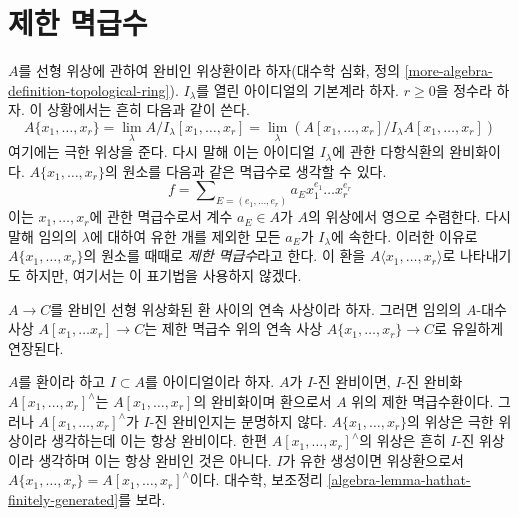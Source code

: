 \section{제한 멱급수}
\label{section-restricted-power-series}

\noindent
$A$를 선형 위상에 관하여 완비인 위상환이라 하자(대수학 심화, 정의
\ref{more-algebra-definition-topological-ring}).
$I_\lambda$를 열린 아이디얼의 기본계라 하자. $r \geq 0$을 정수라 하자.
이 상황에서는 흔히 다음과 같이 쓴다.
$$
A\{x_1, \ldots, x_r\} =
\lim_\lambda A/I_\lambda[x_1, \ldots, x_r] =
\lim_\lambda (A[x_1, \ldots, x_r]/I_\lambda A[x_1, \ldots, x_r])
$$
여기에는 극한 위상을 준다. 다시 말해 이는 아이디얼 $I_\lambda$에
관한 다항식환의 완비화이다. $A\{x_1, \ldots, x_r\}$의 원소를
다음과 같은 멱급수로 생각할 수 있다.
$$
f = \sum\nolimits_{E = (e_1, \ldots, e_r)} a_E x_1^{e_1} \ldots x_r^{e_r}
$$
이는 $x_1, \ldots, x_r$에 관한 멱급수로서 계수 $a_E \in A$가
$A$의 위상에서 영으로 수렴한다. 다시 말해 임의의 $\lambda$에 대하여
유한 개를 제외한 모든 $a_E$가 $I_\lambda$에 속한다. 이러한 이유로
$A\{x_1, \ldots, x_r\}$의 원소를 때때로 {\it 제한 멱급수}라고 한다.
이 환을 $A\langle x_1, \ldots, x_r\rangle$로 나타내기도 하지만,
여기서는 이 표기법을 사용하지 않겠다.

\begin{remark}[제한 멱급수의 보편 성질]
\label{remark-universal-property}
\begin{reference}
\cite[Chapter 0, 7.5.3]{EGA}
\end{reference}
$A \to C$를 완비인 선형 위상화된 환 사이의 연속 사상이라 하자.
그러면 임의의 $A$-대수 사상 $A[x_1, \ldots x_r] \to C$는 제한
멱급수 위의 연속 사상 $A\{x_1, \ldots, x_r\} \to C$로 유일하게 연장된다.
\end{remark}

\begin{remark}
\label{remark-I-adic-completion-and-restricted-power-series}
$A$를 환이라 하고 $I \subset A$를 아이디얼이라 하자. $A$가
$I$-진 완비이면, $I$-진 완비화 $A[x_1, \ldots, x_r]^\wedge$는
$A[x_1, \ldots, x_r]$의 완비화이며 환으로서 $A$ 위의 제한 멱급수환이다.
그러나 $A[x_1, \ldots, x_r]^\wedge$가 $I$-진 완비인지는 분명하지 않다.
$A\{x_1, \ldots, x_r\}$의 위상은 극한 위상이라 생각하는데 이는 항상
완비이다. 한편 $A[x_1, \ldots, x_r]^\wedge$의 위상은 흔히
$I$-진 위상이라 생각하며 이는 항상 완비인 것은 아니다. $I$가 유한
생성이면 위상환으로서
$A\{x_1, \ldots, x_r\} = A[x_1, \ldots, x_r]^\wedge$이다.
대수학, 보조정리 \ref{algebra-lemma-hathat-finitely-generated}를 보라.
\end{remark}

